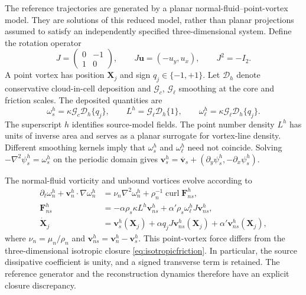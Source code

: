 \documentclass[11pt]{article}
\numberwithin{equation}{section}
\begin{document}
The reference trajectories are generated by a planar normal-fluid--point-vortex model. They are solutions of this reduced model, rather than planar projections assumed to satisfy an independently specified three-dimensional system. Define the rotation operator
\begin{equation}
 J=\begin{pmatrix}0&-1\\1&0\end{pmatrix},
 \qquad J\mathbf u=(-u_y,u_x),\qquad J^2=-I_2.
 \label{eq:rotation}
\end{equation}
A point vortex has position $\mathbf X_j$ and sign $q_j\in\{-1,+1\}$. Let $\mathcal D_h$ denote conservative cloud-in-cell deposition and $\mathcal G_c$, $\mathcal G_\ell$ smoothing at the core and friction scales. The deposited quantities are
\begin{equation}
 \omega_s^h=\kappa\mathcal G_c\mathcal D_h\{q_j\},
 \qquad L^h=\mathcal G_\ell\mathcal D_h\{1\},
 \qquad \omega_\ell^h=\kappa\mathcal G_\ell\mathcal D_h\{q_j\}.
 \label{eq:deposition}
\end{equation}
The superscript $h$ identifies source-model fields. The point number density $L^h$ has units of inverse area and serves as a planar surrogate for vortex-line density. Different smoothing kernels imply that $\omega_s^h$ and $\omega_\ell^h$ need not coincide. Solving $-\nabla^2\psi_s^h=\omega_s^h$ on the periodic domain gives $\mathbf v_s^h=\overline{\mathbf v}_s+(\partial_y\psi_s^h,-\partial_x\psi_s^h)$.

The normal-fluid vorticity and unbound vortices evolve according to
\begin{equation}
 \begin{aligned}
 \partial_t\omega_n^h+\mathbf v_n^h\cdot\nabla\omega_n^h
 &=\nu_n\nabla^2\omega_n^h+
   \rho_n^{-1}\operatorname{curl}\mathbf F_{ns}^h,\\
 \mathbf F_{ns}^h
 &=-\alpha\rho_s\kappa L^h\mathbf v_{ns}^h
   +\alpha'\rho_s\omega_\ell^h J\mathbf v_{ns}^h,\\
 \dot{\mathbf X}_j
 &=\mathbf v_s^h(\mathbf X_j)
   +\alpha q_jJ\mathbf v_{ns}^h(\mathbf X_j)
   +\alpha'\mathbf v_{ns}^h(\mathbf X_j),
 \end{aligned}
 \label{eq:sourceequations}
\end{equation}
where $\nu_n=\mu_n/\rho_n$ and $\mathbf v_{ns}^h=\mathbf v_n^h-\mathbf v_s^h$. This point-vortex force differs from the three-dimensional isotropic closure \eqref{eq:isotropicfriction}. In particular, the source dissipative coefficient is unity, and a signed transverse term is retained. The reference generator and the reconstruction dynamics therefore have an explicit closure discrepancy.
\end{document}
